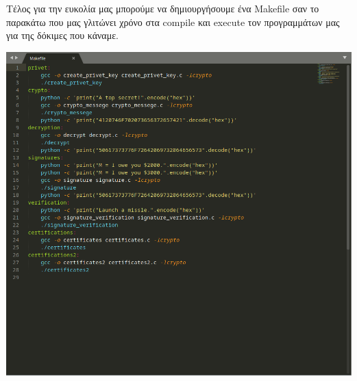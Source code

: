 \pagebreak
\noindent
Τέλος για την ευκολία μας μπορούμε να δημιουργήσουμε ένα Makefile σαν το παρακάτω που μας γλιτώνει χρόνο
στα compile και execute τον προγραμμάτων μας για της δόκιμες που κάναμε.
\begin{center}
			\includegraphics[width=1\textwidth]{image/makefile.PNG}		
\end{center}